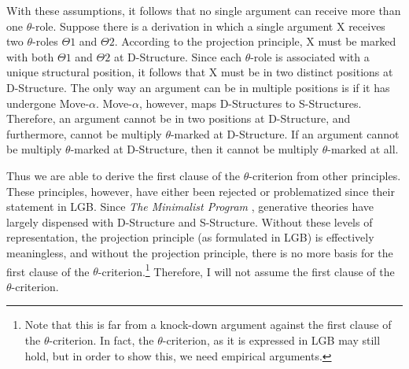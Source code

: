 With these assumptions, it follows that no single argument can receive more than one $\theta$-role.
Suppose there is a derivation in which a single argument X receives two $\theta$-roles $\Theta1$ and $\Theta2$.
According to the projection principle, X must be marked with both $\Theta1$ and $\Theta2$ at D-Structure.
Since each $\theta$-role is associated with a unique structural position, it follows that X must be in two distinct positions at D-Structure.
The only way an argument can be in multiple positions is if it has undergone Move-$\alpha$.
Move-$\alpha$, however, maps D-Structures to S-Structures.
Therefore, an argument cannot be in two positions at D-Structure, and furthermore, cannot be multiply $\theta$-marked at D-Structure.
If an argument cannot be multiply $\theta$-marked at D-Structure, then it cannot be multiply $\theta$-marked at all.

Thus we are able to derive the first clause of the $\theta$-criterion from other principles.
These principles, however, have either been rejected or problematized since their statement in LGB.
Since \textit{The Minimalist Program} \parencite{chomsky1995minimalist}, generative theories have largely dispensed with D-Structure and S-Structure.
Without these levels of representation, the projection principle (as formulated in LGB) is effectively meaningless, and without the projection principle, there is no more basis for the first clause of the $\theta$-criterion.\footnote{
	Note that this is far from a knock-down argument against the first clause of the $\theta$-criterion.
	In fact, the $\theta$-criterion, as it is expressed in LGB may still hold, but in order to show this, we need empirical arguments.
}
Therefore, I will not assume the first clause of the $\theta$-criterion.

